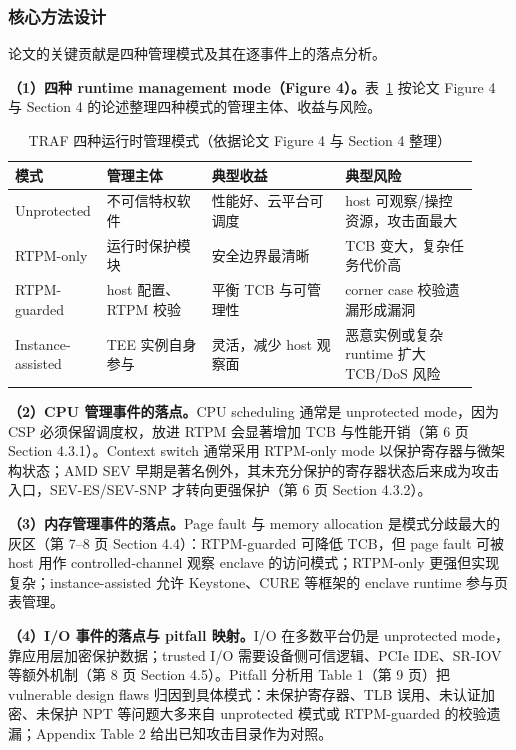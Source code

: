 \documentclass[11pt]{ctexart}
\begin{document}
\subsubsection{核心方法设计}
论文的关键贡献是四种管理模式及其在逐事件上的落点分析。\par
\noindent\textbf{（1）四种 runtime management mode（Figure 4）。}表~\ref{tab:traf-modes} 按论文 Figure 4 与 Section 4 的论述整理四种模式的管理主体、收益与风险。\par
\begin{table}[htbp]
\centering
\caption{TRAF 四种运行时管理模式（依据论文 Figure 4 与 Section 4 整理）}
\label{tab:traf-modes}
\small
\begin{tabular}{p{0.14\linewidth}p{0.22\linewidth}p{0.28\linewidth}p{0.28\linewidth}}
\toprule
模式 & 管理主体 & 典型收益 & 典型风险 \\
\midrule
Unprotected & 不可信特权软件 & 性能好、云平台可调度 & host 可观察/操控资源，攻击面最大 \\
RTPM-only & 运行时保护模块 & 安全边界最清晰 & TCB 变大，复杂任务代价高 \\
RTPM-guarded & host 配置、RTPM 校验 & 平衡 TCB 与可管理性 & corner case 校验遗漏形成漏洞 \\
Instance-assisted & TEE 实例自身参与 & 灵活，减少 host 观察面 & 恶意实例或复杂 runtime 扩大 TCB/DoS 风险 \\
\bottomrule
\end{tabular}
\end{table}
\noindent\textbf{（2）CPU 管理事件的落点。}CPU scheduling 通常是 unprotected mode，因为 CSP 必须保留调度权，放进 RTPM 会显著增加 TCB 与性能开销（第 6 页 Section 4.3.1）。Context switch 通常采用 RTPM-only mode 以保护寄存器与微架构状态；AMD SEV 早期是著名例外，其未充分保护的寄存器状态后来成为攻击入口，SEV-ES/SEV-SNP 才转向更强保护（第 6 页 Section 4.3.2）。\par
\noindent\textbf{（3）内存管理事件的落点。}Page fault 与 memory allocation 是模式分歧最大的灰区（第 7--8 页 Section 4.4）：RTPM-guarded 可降低 TCB，但 page fault 可被 host 用作 controlled-channel 观察 enclave 的访问模式；RTPM-only 更强但实现复杂；instance-assisted 允许 Keystone、CURE 等框架的 enclave runtime 参与页表管理。\par
\noindent\textbf{（4）I/O 事件的落点与 pitfall 映射。}I/O 在多数平台仍是 unprotected mode，靠应用层加密保护数据；trusted I/O 需要设备侧可信逻辑、PCIe IDE、SR-IOV 等额外机制（第 8 页 Section 4.5）。Pitfall 分析用 Table 1（第 9 页）把 vulnerable design flaws 归因到具体模式：未保护寄存器、TLB 误用、未认证加密、未保护 NPT 等问题大多来自 unprotected 模式或 RTPM-guarded 的校验遗漏；Appendix Table 2 给出已知攻击目录作为对照。\par
\end{document}
